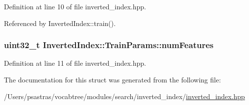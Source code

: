 Definition at line 10 of file inverted\-\_\-index.\-hpp.



Referenced by Inverted\-Index\-::train().

\hypertarget{structInvertedIndex_1_1TrainParams_a7f7dbf8745443ece0694fc79f080966b}{
\subsubsection[{num\-Features}]{\setlength{\rightskip}{0pt plus 5cm}uint32\-\_\-t Inverted\-Index\-::\-Train\-Params\-::num\-Features}}\label{structInvertedIndex_1_1TrainParams_a7f7dbf8745443ece0694fc79f080966b}


Definition at line 11 of file inverted\-\_\-index.\-hpp.



The documentation for this struct was generated from the following file\-:\begin{DoxyCompactItemize}
\item 
/\-Users/psastras/vocabtree/modules/search/inverted\-\_\-index/\hyperlink{inverted__index_8hpp}{inverted\-\_\-index.\-hpp}\end{DoxyCompactItemize}
